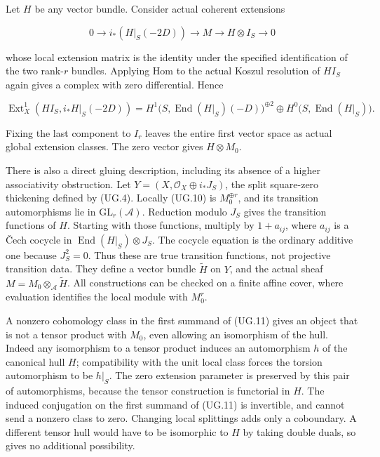 Let \(H\) be any vector bundle. Consider actual coherent extensions

\[
 0\to i_*(H|_S(-2D))\to M\to H\otimes I_S\to0
 \tag{UG.10}
\]

whose local extension matrix is the identity under the specified
identification of the two rank-\(r\) bundles. Applying Hom to the actual
Koszul resolution of \(H I_S\) again gives a complex with zero
differential. Hence

\[
 \operatorname{Ext}^1_X(H I_S,i_*H|_S(-2D))
  =H^1\bigl(S,\operatorname{End}(H|_S)(-D)\bigr)^{\oplus2}
       \oplus H^0\bigl(S,\operatorname{End}(H|_S)\bigr).
 \tag{UG.11}
\]

Fixing the last component to \(I_r\) leaves the entire first vector
space as actual global extension classes. The zero vector gives
\(H\otimes M_0\).

There is also a direct gluing description, including its absence of a
higher associativity obstruction. Let
\(Y=(X,\mathcal O_X\oplus i_*J_S)\), the split square-zero thickening
defined by (UG.4). Locally (UG.10) is \(M_0^{\oplus r}\), and its
transition automorphisms lie in \(\mathrm{GL}_r(\mathcal A)\). Reduction
modulo \(J_S\) gives the transition functions of \(H\). Starting with
those functions, multiply by \(1+a_{ij}\), where \(a_{ij}\) is a Čech
cocycle in \(\operatorname{End}(H|_S)\otimes J_S\). The cocycle equation
is the ordinary additive one because \(J_S^2=0\). Thus these are true
transition functions, not projective transition data. They define a
vector bundle \(\widetilde H\) on \(Y\), and the actual sheaf
\(M=M_0\otimes_{\mathcal A}\widetilde H\). All constructions can be
checked on a finite affine cover, where evaluation identifies the local
module with \(M_0^r\).

A nonzero cohomology class in the first summand of (UG.11) gives an
object that is not a tensor product with \(M_0\), even allowing an
isomorphism of the hull. Indeed any isomorphism to a tensor product
induces an automorphism \(h\) of the canonical hull \(H\); compatibility
with the unit local class forces the torsion automorphism to be
\(h|_S\). The zero extension parameter is preserved by this pair of
automorphisms, because the tensor construction is functorial in \(H\).
The induced conjugation on the first summand of (UG.11) is invertible,
and cannot send a nonzero class to zero. Changing local splittings adds
only a coboundary. A different tensor hull would have to be isomorphic
to \(H\) by taking double duals, so gives no additional possibility.

